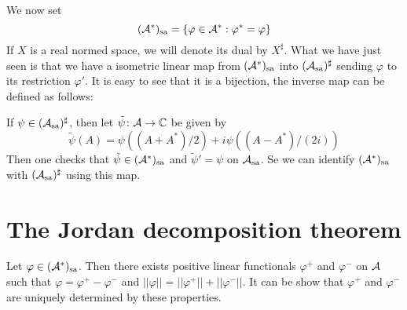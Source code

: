 \documentclass[10pt,english,a4paper]{article}
\theoremstyle{definition}
\def\Assa{\As_{\text{sa}}}
\def\sa{\text{sa}}
\def\vphi{\varphi}
\begin{document}
We now set 
\[  (\As^*)_{\text{sa}} = \{ \vphi \in \As^* : \vphi^* = \vphi \}\]
If $X$ is a real normed space, we will denote its dual by $X^{\sharp}$.
What we have just seen is that we have a isometric linear map from 
$(\mathcal{A}^*)_{\text{sa}}$ into $(\Assa)^{\sharp}$ sending $\vphi$ to its restriction
$\vphi'$. It is easy to see that it is a bijection,
the inverse map can be defined as follows: 

If $\psi \in (\Assa)^{\sharp}$, then let $\tilde{\psi} \colon \mathcal{A} \to \mathbb{C}$ be 
given by 
\[ \tilde{\psi}(A) = \psi((A+A^*)/2) + i\psi((A-A^*)/(2i))  \]
Then one checks that $\tilde{\psi} \in (\mathcal{A}^*)_{\text{sa}}$ and
$\tilde{\psi}'=\psi$ on $\Assa$. Se we can identify 
$(\mathcal{A}^*)_{\text{sa}}$ with $(\Assa)^{\sharp}$ using this map. 

\section{The Jordan decomposition theorem}
Let $\vphi \in (\As^*)_{\sa}$. Then there exists 
positive linear functionals $\vphi^+$ and $\vphi^-$ on $\mathcal{A}$ such that 
$\vphi = \vphi^+ - \vphi^-$ and 
$||\vphi|| = ||\vphi^+|| + ||\vphi^-||$.
It can be show that $\vphi^+$ and $\vphi^-$ are uniquely determined by these
properties. 
\end{document}
